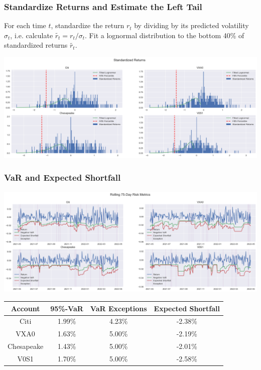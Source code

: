 \documentclass{beamer}
\begin{document}
\begin{frame}
\frametitle{Standardize Returns and Estimate the Left Tail}

For each time $t$, standardize the return $r_t$ by dividing by its predicted volatility $\sigma_t$, i.e. calculate $\tilde{r_t} =  r_t/\sigma_t$. Fit a lognormal distribution to the bottom 40\% of standardized returns $\tilde{r_t}$. 
\begin{center}
\includegraphics[scale = 0.25]{lognorm.png}
\end{center}

\end{frame}

\begin{frame}
\frametitle{VaR and Expected Shortfall}
\begin{center}
\includegraphics[scale = 0.25]{ts_port.png}

\begin{tabular}{| c | c c c |}
\hline
Account	&	95\%-VaR	&	VaR Exceptions	&	Expected Shortfall\\\hline
Citi        	&	1.99\% 		&       4.23\%			&              -2.38\%\\
VXA0        	&	1.63\%		&       5.00\%			&               -2.19\%\\
Chesapeake  &	1.43\%		&        5.00\%			&               -2.01\%\\
V0S1        	&	1.70\%		&        5.00\%			&              -2.58\%\\
\hline
\end{tabular}

\end{center}

\end{frame}
\end{document}
